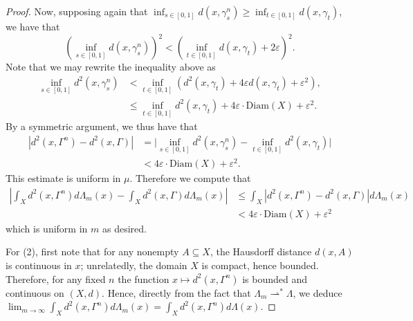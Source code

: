 \documentclass[aos, preprint]{imsart}
\theoremstyle{plain}
\theoremstyle{remark}
\begin{document}
\begin{appendix}
\begin{proof}
Now, supposing again that
$\inf_{ s \in [0,1]} d(x,\gamma^{n}_{ s}) \geq \inf_{ t \in
  [0,1]} d(x,\gamma_{t})$, we have that
\[
  \left(\inf_{ s \in [0,1]} d(x,\gamma^{n}_s)\right)^{2} <
  \left(\inf_{ t \in [0,1]} d(x, \gamma_t) +
  2\varepsilon\right)^{2}.
\]
 Note that
  we may rewrite the inequality above as
\begin{align*}
  \inf_{ s \in [0,1]} d^{2}(x,\gamma^{n}_{ s})
  & < \inf_{ t \in [0,1]} (d^2(x, \gamma_t) + 4 \varepsilon
    d(x, \gamma_t) + \varepsilon^2), \\
  & \leq\inf_{ t \in [0,1] } d^{2}(x,\gamma_{t}) + 4\varepsilon
    \cdot \text{Diam}(X)+\varepsilon^{2}.
\end{align*}
By a symmetric argument, we  thus
have that
\begin{align*}
  |d^{2}(x,\Gamma^{n})-d^{2}(x,\Gamma)|
  &= { \Big |} \inf_{ s \in [0,1]} d^{2}(x,\gamma^{n}_{s}) -
    \inf_{ t \in [0,1]}d^{2}(x,\gamma_{t}) { \Big |}\\
 & <4\varepsilon\cdot\text{Diam}(X)+\varepsilon^{2}.
\end{align*}
This estimate is uniform in $\mu$. Therefore we compute that
\begin{align*}
  \left| \int_{X}d^{2}(x,\Gamma^{n}) d\Lambda_{m}(x) - \int_{X}
  d^{2}(x,\Gamma) d\Lambda_{m}(x)\right|
  & \leq \int_{X} |d^{2}(x,\Gamma^{n})-d^{2}(x,\Gamma)|
  d\Lambda_{m}(x)\\
  & <4\varepsilon\cdot\text{Diam}(X)+\varepsilon^{2}
\end{align*}
which is uniform in $m$ as desired.

For (2), first note that  for any nonempty $A
  \subseteq X$, the Hausdorff distance $d(x, A)$ is continuous in $x$;
  unrelatedly, the domain $X$ is compact, hence bounded. Therefore, for any fixed $n$ the function
$x\mapsto d^{2}(x,\Gamma^{n})$ is bounded and continuous on $(X,d)$.
Hence,
  directly from the fact that $\Lambda_m \rightharpoonup^* \Lambda$,
  we deduce ${ \lim_{m \to \infty}}
\int_{X} d^{2}(x,\Gamma^{n}) d\Lambda_{m}(x) =  \int_{X}
d^{2}(x,\Gamma^{n}) d\Lambda(x)$.
\end{proof}


\end{appendix}
\end{document}
